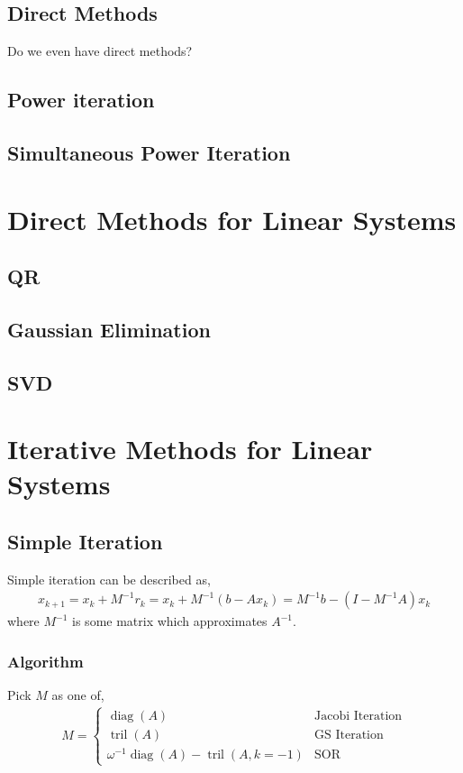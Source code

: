 \documentclass[12pt]{article}
\begin{document}
\subsection{Direct Methods}
Do we even have direct methods?

\subsection{Power iteration}


\subsection{Simultaneous Power Iteration}



\pagebreak
\section{Direct Methods for Linear Systems}
\subsection{QR}

\subsection{Gaussian Elimination}
\subsection{SVD}


\pagebreak
\section{Iterative Methods for Linear Systems}
\subsection{Simple Iteration}

Simple iteration can be described as,
\begin{align*}
    x_{k+1}= x_k+M^{-1} r_k = x_k + M^{-1}(b-Ax_{k}) = M^{-1}b - (I-M^{-1}A)x_{k}
\end{align*}
where \( M^{-1} \) is some matrix which approximates \( A^{-1} \).

\subsubsection{Algorithm}
Pick \( M \) as one of,
\begin{align*}
    M = \begin{cases}
    \operatorname{diag}(A) & \text{Jacobi Iteration}\\
    \operatorname{tril}(A) & \text{GS Iteration}\\
    \omega^{-1}\operatorname{diag}(A) - \operatorname{tril}(A,k=-1) & \text{SOR}
\end{cases}
\end{align*}
\end{document}
